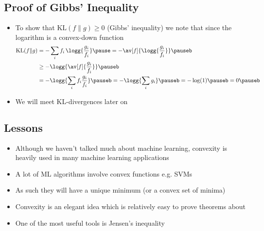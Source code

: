 
\begin{slide}
  \section[-1]{Proof of Gibbs' Inequality}

  \begin{PauseHighLight}
  \begin{itemize}
  \item To show that $\mathrm{KL}(f \| g)\geq 0$ (Gibbs' inequality) we
    note that since the logarithm is a convex-down function
    \begin{align*}
      \mathrm{KL}(f \| g)
      &= - \sum_i f_i \, \logg{\frac{g_i}{f_i}} \pause
        =- \av[f]{\logg{\frac{g_i}{f_i}}}\pauseb\\
      &\geq -\logg{\av[f]{\frac{g_i}{f_i}}}\pauseb \\
      &= - \logg{\sum_i f_i \frac{g_i}{f_i}}\pauseb
      = -\logg{\sum_i g_i}\pauseb = -\log(1) \pauseb = 0\pauseb
    \end{align*}
  \item We will meet KL-divergences later on\pauseb
  \end{itemize}
\end{PauseHighLight}


\end{slide}


\begin{slide}
\section{Lessons}

\begin{PauseHighLight}
  \begin{itemize}
  \item Although we haven't talked much about machine learning,
    convexity is heavily used in many machine learning applications\pause
  \item A lot of ML algorithms involve convex functions\pause{} e.g.{}
    SVMs\pauseb
  \item As such they will have a unique minimum (or a convex set of
    minima)\pause
  \item Convexity is an elegant idea which is relatively easy to
    prove theorems about\pause
  \item One of the most useful tools is Jensen's inequality\pause
  \end{itemize}
\end{PauseHighLight}

\end{slide}


